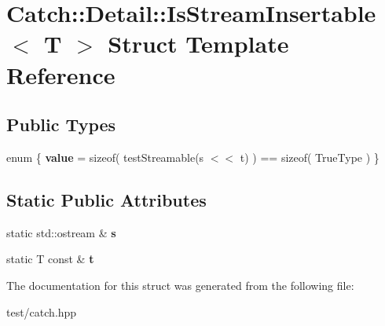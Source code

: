 \hypertarget{structCatch_1_1Detail_1_1IsStreamInsertable}{}\section{Catch\+:\+:Detail\+:\+:Is\+Stream\+Insertable$<$ T $>$ Struct Template Reference}
\label{structCatch_1_1Detail_1_1IsStreamInsertable}
\subsection*{Public Types}
\begin{DoxyCompactItemize}
\item 
enum \{ {\bfseries value} = sizeof( test\+Streamable(s $<$$<$ t) ) == sizeof( True\+Type )
 \}\hypertarget{structCatch_1_1Detail_1_1IsStreamInsertable_a2e4508694da3bf368ff67733a7970edd}{}\label{structCatch_1_1Detail_1_1IsStreamInsertable_a2e4508694da3bf368ff67733a7970edd}

\end{DoxyCompactItemize}
\subsection*{Static Public Attributes}
\begin{DoxyCompactItemize}
\item 
static std\+::ostream \& {\bfseries s}\hypertarget{structCatch_1_1Detail_1_1IsStreamInsertable_abe3d3c8e5d85665747faafffc9a96b00}{}\label{structCatch_1_1Detail_1_1IsStreamInsertable_abe3d3c8e5d85665747faafffc9a96b00}

\item 
static T const \& {\bfseries t}\hypertarget{structCatch_1_1Detail_1_1IsStreamInsertable_a7d2a3da978b6736667a7b2f6d51f507f}{}\label{structCatch_1_1Detail_1_1IsStreamInsertable_a7d2a3da978b6736667a7b2f6d51f507f}

\end{DoxyCompactItemize}


The documentation for this struct was generated from the following file\+:\begin{DoxyCompactItemize}
\item 
test/catch.\+hpp\end{DoxyCompactItemize}
